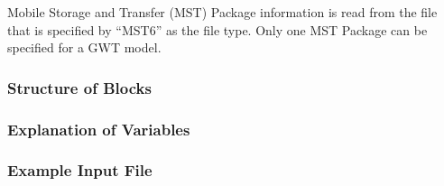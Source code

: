 Mobile Storage and Transfer (MST) Package information is read from the file that is specified by ``MST6'' as the file type.  Only one MST Package can be specified for a GWT model. 

\vspace{5mm}
\subsubsection{Structure of Blocks}



\vspace{5mm}
\subsubsection{Explanation of Variables}
\begin{description}

\end{description}

\vspace{5mm}
\subsubsection{Example Input File}


